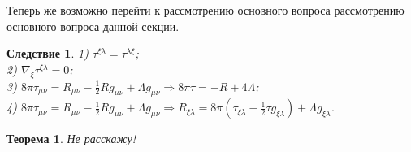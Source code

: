 \documentclass[a4paper, 14pt]{scrarticle}
\theoremstyle{Imperial}
\newtheorem{theorem}{Теорема}
\newtheorem*{consequence}{Следствие}
\begin{document}
	Теперь же возможно перейти к рассмотрению основного вопроса рассмотрению основного вопроса данной секции.
	\begin{consequence}
		1) $\tau^{\xi\lambda} = \tau^{\lambda\xi}$;\\
		2) $\nabla_{\xi} \tau^{\xi\lambda} = 0$;\\
		3) $8\pi \tau_{\mu\nu} = R_{\mu\nu} - \frac{1}{2} R g_{\mu\nu} + \Lambda g_{\mu\nu} \Rightarrow 8\pi \tau = -R + 4\Lambda$;\\
		4) $8\pi \tau_{\mu\nu} = R_{\mu\nu} - \frac{1}{2} R g_{\mu\nu} + \Lambda g_{\mu\nu} \Rightarrow R_{\xi\lambda} = 8\pi\left( \tau_{\xi\lambda} - \frac{1}{2} \tau g_{\xi\lambda} \right) + \Lambda g_{\xi\lambda}$.
	\end{consequence}
	\begin{theorem}\label{Main}
		Не расскажу!
	\end{theorem}
\end{document}
